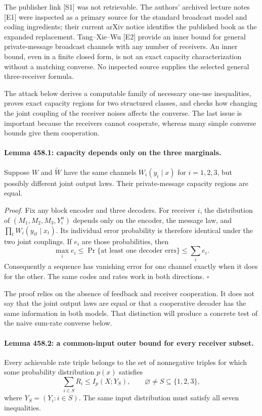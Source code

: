 \documentclass[11pt]{article}
\begin{document}
The publisher link [S1] was not retrievable. The authors' archived lecture
notes [E1] were inspected as a primary source for the standard broadcast
model and coding ingredients; their current arXiv notice identifies the
published book as the expanded replacement. Tang--Xie--Wu [E2] provide
an inner bound for general private-message broadcast channels with any
number of receivers. An inner bound, even in a finite closed form, is
not an exact capacity characterization without a matching converse.
No inspected source supplies the selected general three-receiver formula.

The attack below derives a computable family of necessary one-use
inequalities, proves exact capacity regions for two structured classes,
and checks how changing the joint coupling of the receiver noises affects
the converse. The last issue is important because the receivers cannot
cooperate, whereas many simple converse bounds give them cooperation.

\paragraph{Lemma 458.1: capacity depends only on the three marginals.}
Suppose $W$ and $\widetilde W$ have the same channels
$W_i(y_i\mid x)$ for $i=1,2,3$, but possibly different joint output laws.
Their private-message capacity regions are equal.

\emph{Proof.} Fix any block encoder and three decoders. For receiver $i$,
the distribution of $(M_1,M_2,M_3,Y_i^n)$ depends only on the encoder,
the message law, and $\prod_tW_i(y_{it}\mid x_t)$. Its individual error
probability is therefore identical under the two joint couplings. If
$e_i$ are those probabilities, then
\[
 \max_i e_i\le\Pr\{\text{at least one decoder errs}\}\le\sum_i e_i.
\]
Consequently a sequence has vanishing error for one channel exactly when
it does for the other. The same codes and rates work in both directions.
\hfill$\square$

The proof relies on the absence of feedback and receiver cooperation.
It does not say that the joint output laws are equal or that a cooperative
decoder has the same information in both models. That distinction will
produce a concrete test of the naive sum-rate converse below.

\paragraph{Lemma 458.2: a common-input outer bound for every receiver subset.}
Every achievable rate triple belongs to the set of nonnegative triples
for which some probability distribution $p(x)$ satisfies
\begin{equation}\label{a458:cuts}
 \sum_{i\in S}R_i\le I_p(X;Y_S),
 \qquad\varnothing\ne S\subseteq\{1,2,3\},
\end{equation}
where $Y_S=(Y_i:i\in S)$. The same input distribution must satisfy
all seven inequalities.
\end{document}
